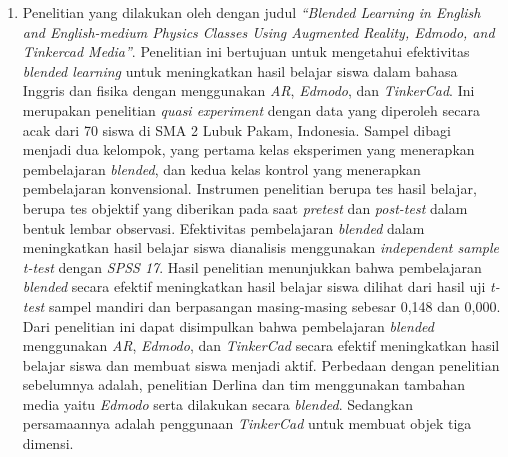\begin{enumerate}
    \item Penelitian yang dilakukan oleh \citet{derlina2020blended} dengan judul \textit{“Blended Learning in English and English-medium Physics Classes Using Augmented Reality, Edmodo, and Tinkercad Media”}. Penelitian ini bertujuan untuk mengetahui efektivitas \textit{blended learning} untuk meningkatkan hasil belajar siswa dalam bahasa Inggris dan fisika dengan menggunakan \textit{AR}, \textit{Edmodo}, dan \textit{TinkerCad}. Ini merupakan penelitian \textit{quasi experiment} dengan data yang diperoleh secara acak dari 70 siswa di SMA 2 Lubuk Pakam, Indonesia. Sampel dibagi menjadi dua kelompok, yang pertama kelas eksperimen yang menerapkan pembelajaran \textit{blended}, dan kedua kelas kontrol yang menerapkan pembelajaran konvensional. Instrumen penelitian berupa tes hasil belajar, berupa tes objektif yang diberikan pada saat \textit{pretest} dan \textit{post-test} dalam bentuk lembar observasi. Efektivitas pembelajaran \textit{blended} dalam meningkatkan hasil belajar siswa dianalisis menggunakan \textit{independent sample t-test} dengan \textit{SPSS 17}. Hasil penelitian menunjukkan bahwa pembelajaran \textit{blended} secara efektif meningkatkan hasil belajar siswa dilihat dari hasil uji \textit{t-test} sampel mandiri dan berpasangan masing-masing sebesar 0{,}148 dan 0{,}000. Dari penelitian ini dapat disimpulkan bahwa pembelajaran \textit{blended} menggunakan \textit{AR}, \textit{Edmodo}, dan \textit{TinkerCad} secara efektif meningkatkan hasil belajar siswa dan membuat siswa menjadi aktif. Perbedaan dengan penelitian sebelumnya adalah, penelitian Derlina dan tim menggunakan tambahan media yaitu \textit{Edmodo} serta dilakukan secara \textit{blended}. Sedangkan persamaannya adalah penggunaan \textit{TinkerCad} untuk membuat objek tiga dimensi.
\end{enumerate}


